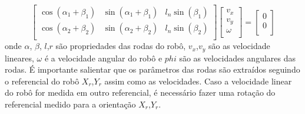 \[
\begin{bmatrix}
    \cos(\alpha_{1} + \beta_{1}) &  \sin(\alpha_{1} + \beta_{1}) &  l_n\sin(\beta_{1}) \\
    \cos(\alpha_{2} + \beta_{2}) &  \sin(\alpha_{2} + \beta_{2})  &  l_n\sin(\beta_{2})\\
\end{bmatrix}
\begin{bmatrix}
    v_x \\
    v_y \\
    \omega\\
\end{bmatrix}
=
\begin{bmatrix}
    0 \\
    0 \\
\end{bmatrix}
\]
onde $\alpha$, $\beta$, $l$,$r$ são propriedades das rodas do robô, $v_x$,$v_y$
são as velocidade lineares, $\omega$ é a
velocidade angular do robô e $phi$ são as velocidades angulares das rodas.
É importante salientar que os parâmetros das
rodas são extraídos seguindo o referencial do robô $X_r$,$Y_r$ assim como
as velocidades. Caso a velocidade linear do robô for medida em outro
referencial, é necessário fazer uma rotação do referencial
medido para a orientação $X_r$,$Y_r$.
